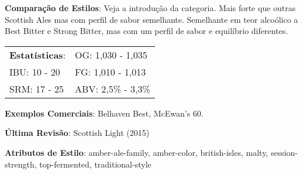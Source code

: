 \textbf{Comparação de Estilos}: Veja a introdução da categoria. Mais forte que outras Scottish Ales mas com perfil de sabor semelhante. Semelhante em teor alcoólico a Best Bitter e Strong Bitter, mas com um perfil de sabor e equilíbrio diferentes.

\begin{tabular}{@{}p{35mm}p{35mm}@{}}
  \textbf{Estatísticas}: & OG: 1,030 - 1,035 \\
  IBU: 10 - 20  & FG: 1,010 - 1,013  \\
  SRM: 17 - 25  & ABV: 2,5\% - 3,3\%
\end{tabular}

\textbf{Exemplos Comerciais}: Belhaven Best, McEwan's 60.

\textbf{Última Revisão}: Scottish Light (2015)

\textbf{Atributos de Estilo}: amber-ale-family, amber-color, british-isles, malty, session-strength, top-fermented, traditional-style